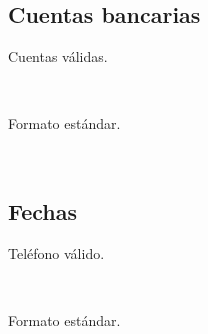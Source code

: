 \documentclass[12pt]{article}
\begin{document}
    \subsection{Cuentas bancarias}
    \begin{description}
        \item [Cuentas válidas.]~\\
        \item [Formato estándar.]~\\
    \end{description}
    \subsection{Fechas}
    \begin{description}
        \item [Teléfono válido.]~\\
        \item [Formato estándar.]~\\
    \end{description}

    \newpage

    \fancyhead[R]{\helv \nouppercase{\rightmark}}
\end{document}
